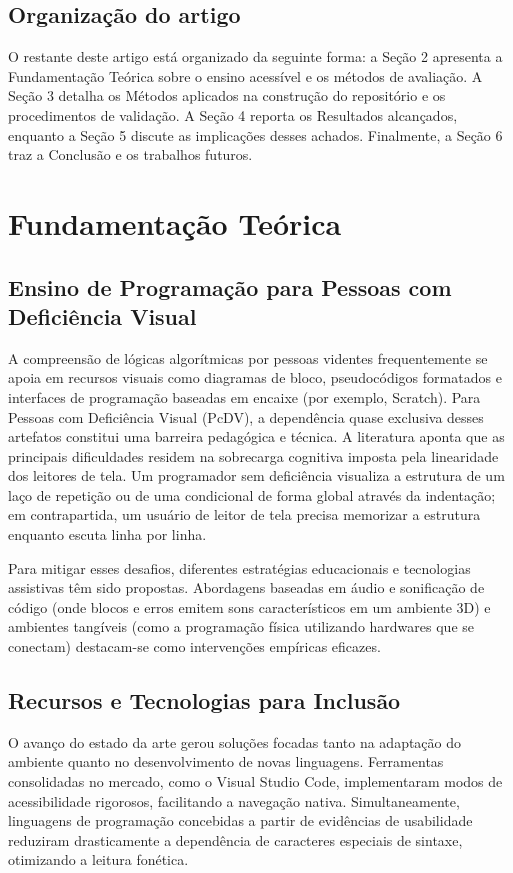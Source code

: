 \documentclass[12pt, a4paper, oneside]{article}
\begin{document}
\subsection{Organização do artigo}
O restante deste artigo está organizado da seguinte forma: a Seção 2 apresenta a Fundamentação Teórica sobre o ensino acessível e os métodos de avaliação. A Seção 3 detalha os Métodos aplicados na construção do repositório e os procedimentos de validação. A Seção 4 reporta os Resultados alcançados, enquanto a Seção 5 discute as implicações desses achados. Finalmente, a Seção 6 traz a Conclusão e os trabalhos futuros.

\section{Fundamentação Teórica}

\subsection{Ensino de Programação para Pessoas com Deficiência Visual}
A compreensão de lógicas algorítmicas por pessoas videntes frequentemente se apoia em recursos visuais como diagramas de bloco, pseudocódigos formatados e interfaces de programação baseadas em encaixe (por exemplo, Scratch). Para Pessoas com Deficiência Visual (PcDV), a dependência quase exclusiva desses artefatos constitui uma barreira pedagógica e técnica. A literatura aponta que as principais dificuldades residem na sobrecarga cognitiva imposta pela linearidade dos leitores de tela. Um programador sem deficiência visualiza a estrutura de um laço de repetição ou de uma condicional de forma global através da indentação; em contrapartida, um usuário de leitor de tela precisa memorizar a estrutura enquanto escuta linha por linha.

Para mitigar esses desafios, diferentes estratégias educacionais e tecnologias assistivas têm sido propostas. Abordagens baseadas em áudio e sonificação de código (onde blocos e erros emitem sons característicos em um ambiente 3D) e ambientes tangíveis (como a programação física utilizando hardwares que se conectam) destacam-se como intervenções empíricas eficazes.

\subsection{Recursos e Tecnologias para Inclusão}
O avanço do estado da arte gerou soluções focadas tanto na adaptação do ambiente quanto no desenvolvimento de novas linguagens. Ferramentas consolidadas no mercado, como o Visual Studio Code, implementaram modos de acessibilidade rigorosos, facilitando a navegação nativa. Simultaneamente, linguagens de programação concebidas a partir de evidências de usabilidade reduziram drasticamente a dependência de caracteres especiais de sintaxe, otimizando a leitura fonética.
\end{document}
